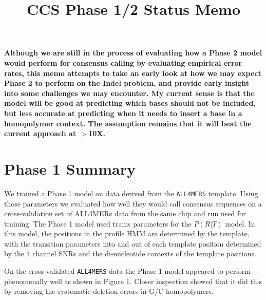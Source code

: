 \documentclass[DIV=calc, paper=a4, fontsize=11pt, twocolumn]{scrartcl}	 %
\title{CCS Phase 1/2 Status Memo} %
\author{ } %
\date{} %
\newcommand{\initial}[1]{ %
\lettrine[lines=3,lhang=0.3,nindent=0em]{
\color{DarkGoldenrod}
{\textsf{#1}}}{}}
\begin{document}
\maketitle %

\thispagestyle{fancy} %


\textbf{Although we are still in the process of evaluating how a Phase 2 model would perform for consensus calling by evaluating empirical error rates, this memo attempts to take an early look at how we may expect Phase 2 to perform on the Indel problem, and provide early insight into some challenges we may encounter.  My current sense is that the model will be good at predicting which bases should not be included, but less accurate at predicting when it needs to insert a base in a homopolymer context.  The assumption remains that it will beat the current approach at $>$10X.}


\section*{Phase 1 Summary}

We trained a Phase 1 model on data derived from the  \texttt{ALL4MERS} template.  Using those parameters we evaluated how well they would call consensus sequences on a cross-validation set of ALL4MERs data from the same chip and run used for training.  The Phase 1 model used trains parameters for the $P(R|T)$ model.  In this model, the positions in the profile HMM are determined by the template, with the transition parameters into and out of each template position determined by the 4 channel SNRs and the  di-nucleotide contexts of the template positions.

On the cross-validated \texttt{ALL4MERS} data the Phase 1 model appeared to perform phenomenally well as shown in Figure 1.  Closer inspection showed that it did this by removing the systematic deletion errors in G/C homopolymers.
\end{document}
